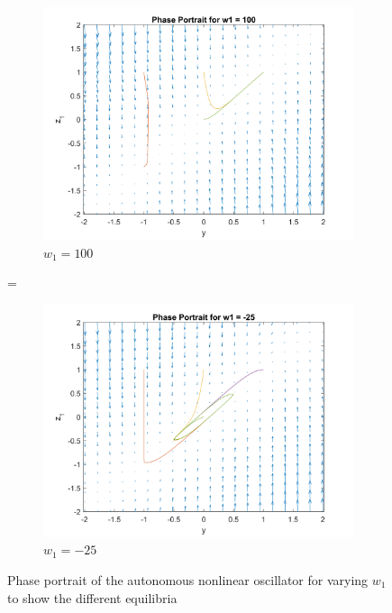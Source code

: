 \documentclass{article}
\begin{document}
\begin{figure}[H]
    \centering
    \begin{subfigure}[b]{0.45\textwidth}
        \centering
        \includegraphics[width=\textwidth]{figures/oscillator_phase_portrait_w100.png}
        \caption{$w_1 = 100$}
        \label{fig:phase_portrait_w100}
    \end{subfigure}=
    \begin{subfigure}[b]{0.45\textwidth}
        \centering
        \includegraphics[width=\textwidth]{figures/oscillator_phase_portrait_w-25.png}
        \caption{$w_1 = -25$}
        \label{fig:phase_portrait_w25}
    \end{subfigure}
    \caption{Phase portrait of the autonomous nonlinear oscillator for varying $w_1$ to show the different equilibria}
\end{figure}
\end{document}
